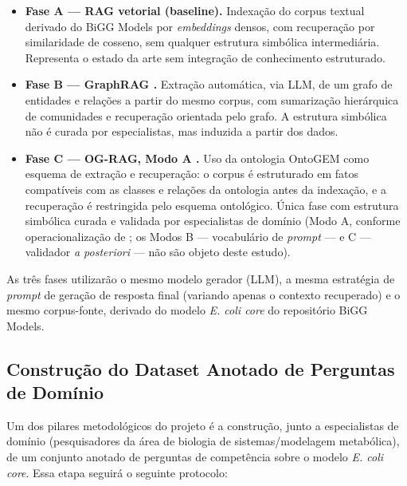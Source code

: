 \documentclass{article}
\begin{document}
\begin{itemize}
	\item \textbf{Fase A --- RAG vetorial (baseline).} Indexação do corpus textual derivado do BiGG Models por \textit{embeddings} densos, com recuperação por similaridade de cosseno, sem qualquer estrutura simbólica intermediária. Representa o estado da arte sem integração de conhecimento estruturado.
	\item \textbf{Fase B --- GraphRAG \cite{edge2024graphrag}.} Extração automática, via LLM, de um grafo de entidades e relações a partir do mesmo corpus, com sumarização hierárquica de comunidades e recuperação orientada pelo grafo. A estrutura simbólica não é curada por especialistas, mas induzida a partir dos dados.
	\item \textbf{Fase C --- OG-RAG, Modo A \cite{sharma2025ograg}.} Uso da ontologia OntoGEM \cite{souza2025ontogem} como esquema de extração e recuperação: o corpus é estruturado em fatos compatíveis com as classes e relações da ontologia antes da indexação, e a recuperação é restringida pelo esquema ontológico. Única fase com estrutura simbólica curada e validada por especialistas de domínio (Modo A, conforme operacionalização de \cite{sharma2025ograg}; os Modos B --- vocabulário de \textit{prompt} --- e C --- validador \textit{a posteriori} --- não são objeto deste estudo).
\end{itemize}

As três fases utilizarão o mesmo modelo gerador (LLM), a mesma estratégia de \textit{prompt} de geração de resposta final (variando apenas o contexto recuperado) e o mesmo corpus-fonte, derivado do modelo \textit{E. coli core} do repositório BiGG Models.

\subsection{Construção do Dataset Anotado de Perguntas de Domínio}

Um dos pilares metodológicos do projeto é a construção, junto a especialistas de domínio (pesquisadores da área de biologia de sistemas/modelagem metabólica), de um conjunto anotado de perguntas de competência sobre o modelo \textit{E. coli core}. Essa etapa seguirá o seguinte protocolo:
\end{document}
